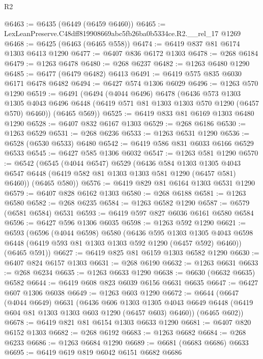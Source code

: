 \begin{lexlean}{R2}
\begin{coremodule}
@6463 := @6435 (@6449 (@6459 @6460))
@6465 := LexLeanPreserve.C48dff819908669abc5fb26ba0b5334ce.R2.__rel_17 @1269
@6468 := @6425 (@6463 (@6465 @558))
@6474 := @6419 @837 @81 @6174 @1303 @6413 @1290
@6477 := @6407 @836 @6172 @1303
@6478 := @268 @6184
@6479 := @1263 @6478
@6480 := @268 @6237
@6482 := @1263 @6480 @1290
@6485 := @6477 (@6479 @6482) @6413
@6491 := @6419 @575 @835 @6030 @6171 @6478 @6482
@6494 := @6427 @574 @1306 @6029
@6496 := @1263 @570 @1290
@6519 := @6491
    (@6494
      (@4044 @6496)
      @6478
      (@6436
        @573
        @1303
        @1305
        @4043
        @6496
        @6448
        (@6419 @571 @81 @1303 @1303 @570 @1290 (@6457 @570) @6460))
      (@6465 @569))
@6525 := @6419 @833 @81 @6169 @1303 @6480 @1290
@6528 := @6407 @832 @6167 @1303
@6529 := @268 @6186
@6530 := @1263 @6529
@6531 := @268 @6236
@6533 := @1263 @6531 @1290
@6536 := @6528 (@6530 @6533) @6480
@6542 := @6419 @586 @831 @6033 @6166 @6529 @6533
@6545 := @6427 @585 @1306 @6032
@6547 := @1263 @581 @1290
@6570 := @6542
    (@6545
      (@4044 @6547)
      @6529
      (@6436
        @584
        @1303
        @1305
        @4043
        @6547
        @6448
        (@6419 @582 @81 @1303 @1303 @581 @1290 (@6457 @581) @6460))
      (@6465 @580))
@6576 := @6419 @829 @81 @6164 @1303 @6531 @1290
@6579 := @6407 @828 @6162 @1303
@6580 := @268 @6188
@6581 := @1263 @6580
@6582 := @268 @6235
@6584 := @1263 @6582 @1290
@6587 := @6579 (@6581 @6584) @6531
@6593 := @6419 @597 @827 @6036 @6161 @6580 @6584
@6596 := @6427 @596 @1306 @6035
@6598 := @1263 @592 @1290
@6621 := @6593
    (@6596
      (@4044 @6598)
      @6580
      (@6436
        @595
        @1303
        @1305
        @4043
        @6598
        @6448
        (@6419 @593 @81 @1303 @1303 @592 @1290 (@6457 @592) @6460))
      (@6465 @591))
@6627 := @6419 @825 @81 @6159 @1303 @6582 @1290
@6630 := @6407 @824 @6157 @1303
@6631 := @268 @6190
@6632 := @1263 @6631
@6633 := @268 @6234
@6635 := @1263 @6633 @1290
@6638 := @6630 (@6632 @6635) @6582
@6644 := @6419 @608 @823 @6039 @6156 @6631 @6635
@6647 := @6427 @607 @1306 @6038
@6649 := @1263 @603 @1290
@6672 := @6644
    (@6647
      (@4044 @6649)
      @6631
      (@6436
        @606
        @1303
        @1305
        @4043
        @6649
        @6448
        (@6419 @604 @81 @1303 @1303 @603 @1290 (@6457 @603) @6460))
      (@6465 @602))
@6678 := @6419 @821 @81 @6154 @1303 @6633 @1290
@6681 := @6407 @820 @6152 @1303
@6682 := @268 @6192
@6683 := @1263 @6682
@6684 := @268 @6233
@6686 := @1263 @6684 @1290
@6689 := @6681 (@6683 @6686) @6633
@6695 := @6419 @619 @819 @6042 @6151 @6682 @6686

\end{coremodule}
\end{lexlean}
